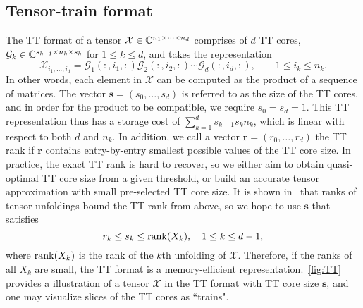 \documentclass[11pt,a4paper,review]{siamart220329}
\newcommand{\rank}{{\rm rank}}
\begin{document}
\subsection{Tensor-train format} \label{sec:TT}
The TT format of a tensor $\mathcal{X}\in\mathbb{C}^{n_1\times \cdots \times n_d}$ comprises of $d$ TT cores, $\mathcal{G}_k \in \mathbb{C}^{s_{k-1} \times n_k \times s_k}$ for $1 \le k \le d$, and takes the representation
\[
\mathcal{X}_{i_1,\ldots,i_d} = \mathcal{G}_1(:,i_1,:)\mathcal{G}_2(:,i_2,:) \cdots \mathcal{G}_d(:,i_d,:), \qquad 1\leq i_k \leq n_k.
\]
In other words, each element in $\mathcal{X}$ can be computed as the product of a sequence of matrices. The vector $\pmb{s} = (s_0,\ldots,s_d)$ is referred to as the size of the TT cores, and in order for the product to be compatible, we require $s_0 = s_d = 1$. This TT representation thus has a storage cost of $\sum_{k=1}^d s_{k-1}s_k n_k$, which is linear with respect to both $d$ and $n_k$. In addition, we call a vector $\pmb{r}= (r_0,\ldots,r_d)$ the TT rank if $\pmb{r}$ contains entry-by-entry smallest possible values of the TT core size. In practice, the exact TT rank is hard to recover, so we either aim to obtain quasi-optimal TT core size from a given threshold, or build an accurate tensor approximation with small pre-selected TT core size. It is shown in~\cite{oseledets2011tensor} that ranks of tensor unfoldings bound the TT rank from above, so we hope to use $\pmb{s}$ that satisfies
\begin{equation} \label{eq:TT_trivial}
r_k \le s_k \le {\rm rank}(X_k), \quad 1 \le k \le d-1,
\end{equation}
where $\rank(X_k)$ is the rank of the $k$th unfolding of $\mathcal{X}$. Therefore, if the ranks of all $X_k$ are small, the TT format is a memory-efficient representation.~\cref{fig:TT} provides a illustration of a tensor $\mathcal{X}$ in the TT format with TT core size $\pmb{s}$, and one may visualize slices of the TT cores as ``trains".
\end{document}

